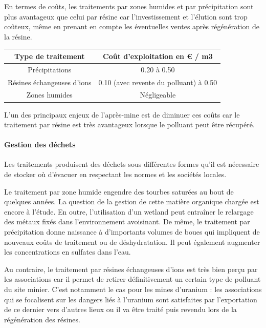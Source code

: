 \documentclass{article}
\begin{document}
En termes de coûts, les traitements par zones humides et par précipitation sont plus avantageux que celui par résine car l’investissement et l’élution sont trop coûteux, même en prenant en compte les éventuelles ventes après régénération de la résine.


\begin{center}
\begin{tabular}{ |c |c |}
\hline
 Type de traitement & Coût d’exploitation en € / m3 \\ 
 \hline
 Précipitations & 0.20 à 0.50 \\ 
 \hline
 Résines échangeuses d’ions & 0.10 (avec revente du polluant) à 0.50  \\
 \hline
Zones humides & Négligeable  \\
 \hline
\end{tabular}
\end{center}

L’un des principaux enjeux de l’après-mine est de diminuer ces coûts car le traitement par résine est très avantageux lorsque le polluant peut être récupéré.

\paragraph{Gestion des déchets }

Les traitements produisent des déchets sous différentes formes qu’il est nécessaire de stocker où d’évacuer en respectant les normes et les sociétés locales.

Le traitement par zone humide engendre des tourbes saturées au bout de quelques années. La question de la gestion de cette matière organique chargée est encore à l’étude. En outre, l’utilisation d’un wetland peut entraîner le relargage des métaux fixés dans l’environnement avoisinant.
De même, le traitement par précipitation donne naissance à d’importants volumes de boues qui impliquent de nouveaux coûts de traitement ou de déshydratation. Il peut également augmenter les concentrations en sulfates dans l’eau. 

Au contraire, le traitement par résines échangeuses d’ions est très bien perçu par les associations car il permet de retirer définitivement un certain type de polluant du site minier. C’est notamment le cas pour les mines d’uranium : les associations qui se focalisent sur les dangers liés à l’uranium sont satisfaites par l’exportation de ce dernier vers d’autres lieux ou il va être traité puis revendu lors de la régénération des résines.
\end{document}
